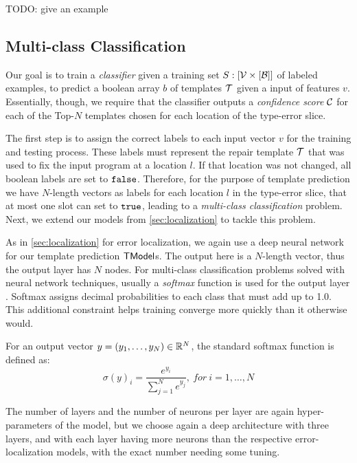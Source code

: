 TODO: give an example


\subsection{Multi-class Classification}
\label{subsec:multi-class}
Our goal is to train a \emph{classifier} given a training set $S : [\mathcal{V}
\times [\mathcal{B}]]$ of labeled examples, to predict a boolean array $b$ of
templates $\mathcal{T}$ given a input of features $v$. Essentially, though, we require
that the classifier outputs a \emph{confidence score} $\mathcal{C}$ for each of the
Top-$N$ templates chosen for each location of the type-error slice.

The first step is to assign the correct labels to each input vector $v$ for the
training and testing process. These labels must represent the repair template
$\mathcal{T}$ that was used to fix the input program at a location $l$. If that location
was not changed, all boolean labels are set to $\mathtt{false}$. Therefore, for the
purpose of template prediction we have $N$-length vectors as labels for each
location $l$ in the type-error slice, that at most one slot can set to $\mathtt{true}$,
leading to a \emph{multi-class classification} problem. Next, we extend our
models from \autoref{sec:localization} to tackle this problem.

As in \autoref{sec:localization} for error localization, we again use a deep
neural network for our template prediction $\mathsf{TModel}$s. The output here is a
$N$-length vector, thus the output layer has $N$ nodes. For multi-class
classification problems solved with neural network techniques, usually a
\emph{softmax} function is used for the output layer
\citep[][]{Goodfellow-et-al-2016, Bishop-book-2006}. Softmax assigns decimal
probabilities to each class that must add up to 1.0. This additional constraint
helps training converge more quickly than it otherwise would.

For an output vector $y = (y_1, \dots, y_N) \in \mathbb{R}^{N}$, the standard softmax
function is defined as:
\[ \sigma(y)_i = \frac{e^{y_i}}{\sum_{j=1}^{N} e^{y_j}},\ for\ i = 1, \dots, N \]

The number of layers and the number of neurons per layer are again
hyper-parameters of the model, but we choose again a deep architecture with
three layers, and with each layer having more neurons than the respective
error-localization models, with the exact number needing some tuning.

